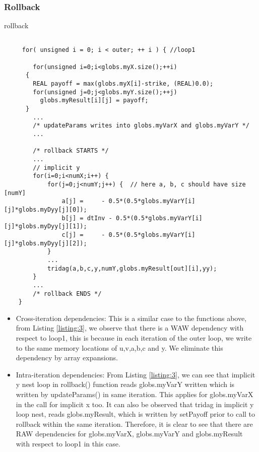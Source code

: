\documentclass{article}
\begin{document}
\subsubsection*{Rollback}
\begin{listing}[H]
\caption{rollback}
\begin{verbatim}
    
     for( unsigned i = 0; i < outer; ++ i ) { //loop1
        
        for(unsigned i=0;i<globs.myX.size();++i)
      {
        REAL payoff = max(globs.myX[i]-strike, (REAL)0.0);
        for(unsigned j=0;j<globs.myY.size();++j)
          globs.myResult[i][j] = payoff;
      }
        ...
        /* updateParams writes into globs.myVarX and globs.myVarY */
        ...
 
        /* rollback STARTS */
        ...
        // implicit y
        for(i=0;i<numX;i++) { 
            for(j=0;j<numY;j++) {  // here a, b, c should have size [numY]
                a[j] =     - 0.5*(0.5*globs.myVarY[i][j]*globs.myDyy[j][0]);
                b[j] = dtInv - 0.5*(0.5*globs.myVarY[i][j]*globs.myDyy[j][1]);
                c[j] =     - 0.5*(0.5*globs.myVarY[i][j]*globs.myDyy[j][2]);
            }
            ...
            tridag(a,b,c,y,numY,globs.myResult[out][i],yy);
        }
        ...
        /* rollback ENDS */
    }     
\end{verbatim}
\label{listing:3}
\end{listing}
\begin{itemize}
     \item {Cross-iteration dependencies: This is a similar case to the functions above, from Listing \ref{listing:3}, we observe that there is a WAW dependency with respect to loop1, this is because in each iteration of the outer loop, we write to the same memory locations of u,v,a,b,c and y. We eliminate this dependency by array expansions. }
    
    \item {Intra-iteration dependencies: From Listing \ref{listing:3}, we can see that implicit y nest loop in rollback() function reads globs.myVarY written which is written by updateParams() in same iteration. This applies for globs.myVarX in the call for implicit x too. It can also be observed that tridag in implicit y loop nest, reads globs.myResult, which is written by setPayoff prior to call to rollback within the same iteration. Therefore, it is clear to see that there are RAW dependencies for globs.myVarX,  globs.myVarY and globs.myResult with respect to loop1 in this case.}
\end{itemize}
\end{document}
